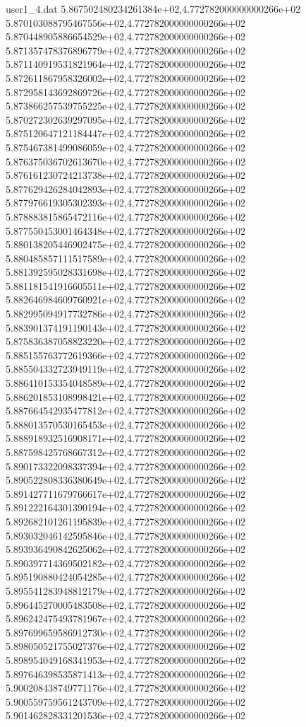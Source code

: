 \begin{filecontents}{user1_4.dat}
5.867502480234261384e+02,4.772782000000000266e+02
5.870103088795467556e+02,4.772782000000000266e+02
5.870448905886654529e+02,4.772782000000000266e+02
5.871357478376896779e+02,4.772782000000000266e+02
5.871140919531821964e+02,4.772782000000000266e+02
5.872611867958326002e+02,4.772782000000000266e+02
5.872958143692869726e+02,4.772782000000000266e+02
5.873866257539755225e+02,4.772782000000000266e+02
5.870272302639297095e+02,4.772782000000000266e+02
5.875120647121184447e+02,4.772782000000000266e+02
5.875467381499086059e+02,4.772782000000000266e+02
5.876375036702613670e+02,4.772782000000000266e+02
5.876161230724213738e+02,4.772782000000000266e+02
5.877629426284042893e+02,4.772782000000000266e+02
5.877976619305302393e+02,4.772782000000000266e+02
5.878883815865472116e+02,4.772782000000000266e+02
5.877550453001464348e+02,4.772782000000000266e+02
5.880138205446902475e+02,4.772782000000000266e+02
5.880485857111517589e+02,4.772782000000000266e+02
5.881392595028331698e+02,4.772782000000000266e+02
5.881181541916605511e+02,4.772782000000000266e+02
5.882646984609760921e+02,4.772782000000000266e+02
5.882995094917732786e+02,4.772782000000000266e+02
5.883901374191190143e+02,4.772782000000000266e+02
5.875836387058823220e+02,4.772782000000000266e+02
5.885155763772619366e+02,4.772782000000000266e+02
5.885504332723949119e+02,4.772782000000000266e+02
5.886410153354048589e+02,4.772782000000000266e+02
5.886201853108998421e+02,4.772782000000000266e+02
5.887664542935477812e+02,4.772782000000000266e+02
5.888013570530165453e+02,4.772782000000000266e+02
5.888918932516908171e+02,4.772782000000000266e+02
5.887598425768667312e+02,4.772782000000000266e+02
5.890173322098337394e+02,4.772782000000000266e+02
5.890522808336380649e+02,4.772782000000000266e+02
5.891427711679766617e+02,4.772782000000000266e+02
5.891222164301390194e+02,4.772782000000000266e+02
5.892682101261195839e+02,4.772782000000000266e+02
5.893032046142595846e+02,4.772782000000000266e+02
5.893936490842625062e+02,4.772782000000000266e+02
5.890397714369502182e+02,4.772782000000000266e+02
5.895190880424054285e+02,4.772782000000000266e+02
5.895541283948812179e+02,4.772782000000000266e+02
5.896445270005483508e+02,4.772782000000000266e+02
5.896242475493781967e+02,4.772782000000000266e+02
5.897699659586912730e+02,4.772782000000000266e+02
5.898050521755027376e+02,4.772782000000000266e+02
5.898954049168341953e+02,4.772782000000000266e+02
5.897646398535871413e+02,4.772782000000000266e+02
5.900208438749771176e+02,4.772782000000000266e+02
5.900559759561243709e+02,4.772782000000000266e+02
5.901462828331201536e+02,4.772782000000000266e+02

\end{filecontents}
